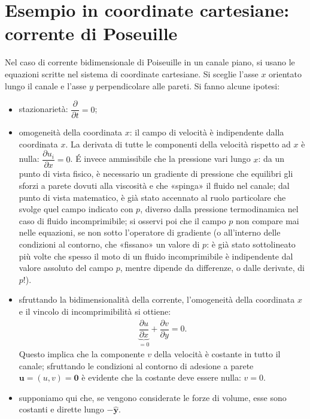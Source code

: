 \documentclass[letterpaper,10pt,italian]{jupyterBook}
\begin{document}
\section{Esempio in coordinate cartesiane: corrente di Poseuille}
\label{\detokenize{polimi/fluidmechanics-ita/template/capitoli/06_slnEsatte/0600in:esempio-in-coordinate-cartesiane-corrente-di-poseuille}}
\sphinxAtStartPar
Nel caso di corrente bidimensionale di Poiseuille in un canale piano, si
usano le equazioni scritte nel sistema di coordinate cartesiane. Si
sceglie l’asse \(x\) orientato lungo il canale e l’asse \(y\) perpendicolare
alle pareti. Si fanno alcune ipotesi:
\begin{itemize}
\item {} 
\sphinxAtStartPar
stazionarietà: \(\dfrac{\partial}{\partial t} = 0\);

\item {} 
\sphinxAtStartPar
omogeneità della coordinata \(x\): il campo di velocità è indipendente
dalla coordinata \(x\). La derivata di tutte le componenti della
velocità rispetto ad \(x\) è nulla:
\(\dfrac{\partial u_i}{\partial x} = 0\). É invece ammissibile che la
pressione vari lungo \(x\): da un punto di vista fisico, è necessario
un gradiente di pressione che equilibri gli sforzi a parete dovuti
alla viscosità e che «spinga» il fluido nel canale; dal punto di
vista matematico, è già stato accennato al ruolo particolare che
svolge quel campo indicato con \(p\), diverso dalla pressione
termodinamica nel caso di fluido incomprimibile; si osservi poi che
il campo \(p\) non compare mai nelle equazioni, se non sotto
l’operatore di gradiente (o all’interno delle condizioni al
contorno, che «fissano» un valore di \(p\): è già stato sottolineato
più volte che spesso il moto di un fluido incomprimibile è
indipendente dal valore assoluto del campo \(p\), mentre dipende da
differenze, o dalle derivate, di \(p\)!).

\item {} 
\sphinxAtStartPar
sfruttando la bidimensionalità della corrente, l’omogeneità della
coordinata \(x\) e il vincolo di incomprimibilità si ottiene:
\begin{equation*}
\begin{split}\underbrace{\dfrac{\partial u}{\partial x}}_{=0} + \dfrac{\partial v}{\partial y} = 0.\end{split}
\end{equation*}
\sphinxAtStartPar
Questo implica che la componente \(v\) della velocità è costante in
tutto il canale; sfruttando le condizioni al contorno di adesione a
parete \(\mathbf{u} = (u,v) = \mathbf{0}\) è evidente che la costante deve
essere nulla: \(v = 0\).

\item {} 
\sphinxAtStartPar
supponiamo qui che, se vengono considerate le forze di volume, esse
sono costanti e dirette lungo \(-\mathbf{\hat{y}}\).

\end{itemize}
\end{document}
